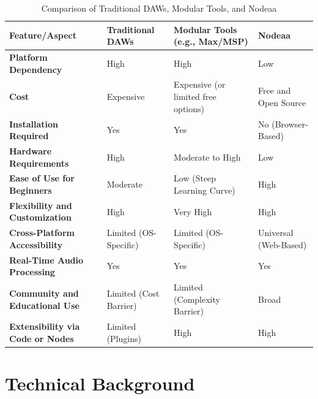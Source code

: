\documentclass[10pt,twocolumn]{article}
\begin{document}
\begin{table}[ht]
\centering
\caption{Comparison of Traditional DAWs, Modular Tools, and Nodeaa}
\label{tab:comparison}
\begin{tabular}{|l|l|l|l|}
\hline
\textbf{Feature/Aspect}                  & \textbf{Traditional DAWs}         & \textbf{Modular Tools (e.g., Max/MSP)} & \textbf{Nodeaa}        \\ \hline
\textbf{Platform Dependency}             & High                              & High                                   & Low                    \\ \hline
\textbf{Cost}                            & Expensive                         & Expensive (or limited free options)    & Free and Open Source   \\ \hline
\textbf{Installation Required}           & Yes                               & Yes                                    & No (Browser-Based)     \\ \hline
\textbf{Hardware Requirements}           & High                              & Moderate to High                       & Low                    \\ \hline
\textbf{Ease of Use for Beginners}       & Moderate                          & Low (Steep Learning Curve)             & High                   \\ \hline
\textbf{Flexibility and Customization}   & High                              & Very High                              & High                   \\ \hline
\textbf{Cross-Platform Accessibility}    & Limited (OS-Specific)             & Limited (OS-Specific)                  & Universal (Web-Based)  \\ \hline
\textbf{Real-Time Audio Processing}      & Yes                               & Yes                                    & Yes                    \\ \hline
\textbf{Community and Educational Use}   & Limited (Cost Barrier)            & Limited (Complexity Barrier)           & Broad                  \\ \hline
\textbf{Extensibility via Code or Nodes} & Limited (Plugins)                 & High                                   & High                   \\ \hline
\end{tabular}
\end{table}

\section{Technical Background}
\end{document}

